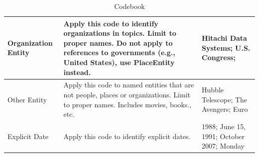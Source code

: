 \documentclass[runningheads,a4paper]{llncs}
\begin{document}
\begin{table}[H]
{\begin{tabular}{| p{3cm} | p{6cm}  | p{6cm} |}
Organization Entity & Apply this code to identify organizations in topics. Limit to proper names. Do not apply to references to governments (e.g., United States), use PlaceEntity instead. & Hitachi Data Systems; U.S. Congress; \\ \hline
Other Entity & Apply this code to named entities that are not people, places or organizations. Limit to proper names. Includes movies, books., etc. & Hubble Telescope; The Avengers; Euro	\\ \hline
Explicit Date & Apply this code to identify explicit dates. & 1988; June 15, 1991; October 2007; Monday \\ \hline
\end{tabular}}
\caption{Codebook}
\label{table.codebook}
\end{table}
\end{document}
